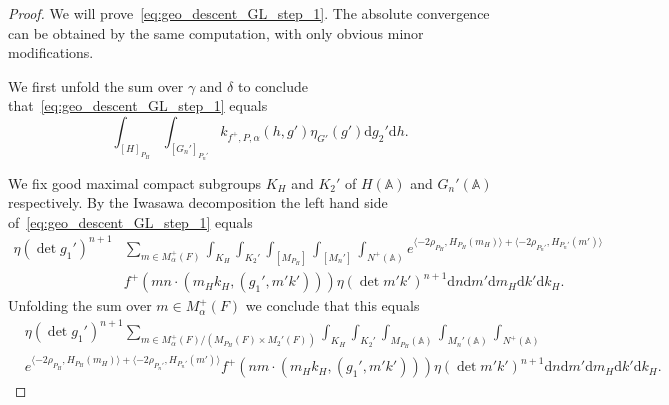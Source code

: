 \documentclass[letterpaper,11pt]{amsart}
\newcommand{\bA}{\mathbb{A}}
\newcommand{\rd}{\mathrm{d}}
\newcommand{\<}{\negthickspace}
\theoremstyle{definition}
\theoremstyle{plain}
\theoremstyle{remark}
\numberwithin{equation}{section}
\begin{document}
\begin{proof}
We will prove~\eqref{eq:geo_descent_GL_step_1}. The absolute convergence can
be obtained by the same computation, with only obvious minor modifications.

We first unfold the sum over $\gamma$ and $\delta$ to conclude
that~\eqref{eq:geo_descent_GL_step_1} equals
    \[
    \int_{[H]_{P_H}} \int_{[G_n']_{P_{n}'}}
    k_{f^+, P, \alpha}(h,  g') \eta_{G'}(g') \rd g_2' \rd h.
    \]

We fix good maximal compact subgroups $K_H$ and $K_2'$ of $H(\bA)$ and $G_n'(\bA)$ respectively. By the Iwasawa decomposition the left hand side
of~\eqref{eq:geo_descent_GL_step_1} equals
    \begin{align*}
    \eta(\det g_1')^{n+1} &
    \sum_{m \in M_{\alpha}^+(F)}
    \int_{K_H}
    \int_{K_2'} \int_{[M_{P_H}]} \int_{[M_n']} \int_{N^+(\bA)}
     e^{\langle
    -2\rho_{P_H},H_{P_H}(m_H)\rangle+\langle -2\rho_{P_n'}, H_{P_n'}(m')
    \rangle }
    \\ &f^+ (mn \cdot (m_H k_H, (g_1',m'k')))
     \eta(\det m'k')^{n+1} \rd n \rd m'  \rd m_H  \rd k' \rd k_H.
    \end{align*}
Unfolding the sum over $m \in M_{\alpha}^+(F)$ we conclude that this equals
    \begin{align*}
    &\eta(\det g_1')^{n+1}
    \sum_{m \in M^+_{\alpha}(F)/(M_{P_H}(F)  \times
    M_2'(F))}
    \int_{K_H} \int_{K_2'} \int_{M_{P_H}(\bA)}
    \int_{M_n'(\bA)} \int_{N^+(\bA)}
      \\
    &e^{\langle
    -2\rho_{P_H},H_{P_H}(m_H)\rangle
    +\langle -2\rho_{P_n'},H_{P_n'}(m') \rangle }
    f^+ \left(nm \cdot (m_H k_H, (g_1',m'k'))\right)
    \eta(\det m'k')^{n+1} \rd n \rd m'  \rd m_H \rd k' \rd k_H.
    \end{align*}


\end{proof}
\end{document}
